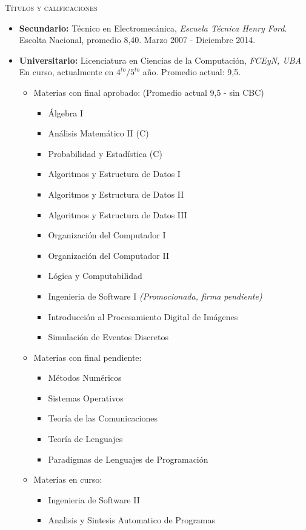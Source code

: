 \textsc{Títulos y calificaciones}
\begin{itemize}
    \item \textbf{Secundario:} Técnico en Electromecánica, \textit{Escuela Técnica Henry Ford}.
        Escolta Nacional, promedio 8,40. Marzo 2007 - Diciembre 2014.
    \item \textbf{Universitario:} Licenciatura en Ciencias de la Computación, \textit{FCEyN, UBA} En
        curso, actualmente en $4^{to}/5^{to}$ año. Promedio actual: 9,5.
        \begin{itemize}
            \item Materias con final aprobado: (Promedio actual 9,5 - sin CBC)
                \begin{itemize}
                    \item Álgebra I
                    \item Análisis Matemático II (C)
                    \item Probabilidad y Estadística (C)
                    \item Algoritmos y Estructura de Datos I
                    \item Algoritmos y Estructura de Datos II
                    \item Algoritmos y Estructura de Datos III
                    \item Organización del Computador I
                    \item Organización del Computador II
                    \item Lógica y Computabilidad
                    \item Ingenieria de Software I \textit{(Promocionada, firma pendiente)}
                    \item Introducción al Procesamiento Digital de Imágenes
                    \item Simulación de Eventos Discretos
                \end{itemize}
            \item Materias con final pendiente:
                \begin{itemize}
                    \item Métodos Numéricos
                    \item Sistemas Operativos
                    \item Teoría de las Comunicaciones
                    \item Teoría de Lenguajes
                    \item Paradigmas de Lenguajes de Programación
                \end{itemize}
            \item Materias en curso:
                \begin{itemize}
                    \item Ingenieria de Software II
                    \item Analisis y Sintesis Automatico de Programas
                \end{itemize}
        \end{itemize}
\end{itemize}

